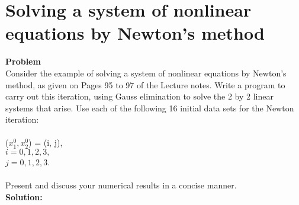 \newpage
\section{Solving a system of nonlinear equations by Newton's method}%
\label{sec:solving_a_system_of_nonlinear_equations_by_newton_s_method}

\textbf{Problem}
\\
Consider the example of solving a system of nonlinear equations by Newton’s method, as given on Pages 95 to 97 of the Lecture notes. 
Write a program to carry out this iteration, using Gauss elimination to solve the 2 by 2 linear systems
that arise.
Use each of the following 16 initial data sets for the Newton iteration:
\\
\\
($x_{1}^{0}, x_{2}^{0}$) = (i, j),\\
$i = 0, 1, 2, 3, $\\
 $j = 0, 1, 2, 3$.\\
 \\
Present and discuss your numerical results in a concise manner.
\\
\textbf{Solution:}
\newpage

